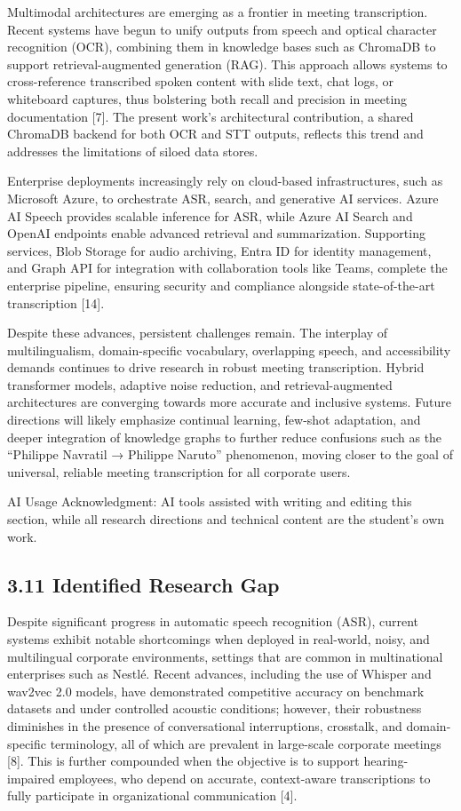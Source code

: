 \documentclass[12pt,a4paper]{article}
\begin{document}
Multimodal architectures are emerging as a frontier in meeting transcription. Recent systems have begun to unify outputs from speech and optical character recognition (OCR), combining them in knowledge bases such as ChromaDB to support retrieval-augmented generation (RAG). This approach allows systems to cross-reference transcribed spoken content with slide text, chat logs, or whiteboard captures, thus bolstering both recall and precision in meeting documentation [7]. The present work’s architectural contribution, a shared ChromaDB backend for both OCR and STT outputs, reflects this trend and addresses the limitations of siloed data stores.


Enterprise deployments increasingly rely on cloud-based infrastructures, such as Microsoft Azure, to orchestrate ASR, search, and generative AI services. Azure AI Speech provides scalable inference for ASR, while Azure AI Search and OpenAI endpoints enable advanced retrieval and summarization. Supporting services, Blob Storage for audio archiving, Entra ID for identity management, and Graph API for integration with collaboration tools like Teams, complete the enterprise pipeline, ensuring security and compliance alongside state-of-the-art transcription [14].


Despite these advances, persistent challenges remain. The interplay of multilingualism, domain-specific vocabulary, overlapping speech, and accessibility demands continues to drive research in robust meeting transcription. Hybrid transformer models, adaptive noise reduction, and retrieval-augmented architectures are converging towards more accurate and inclusive systems. Future directions will likely emphasize continual learning, few-shot adaptation, and deeper integration of knowledge graphs to further reduce confusions such as the “Philippe Navratil → Philippe Naruto” phenomenon, moving closer to the goal of universal, reliable meeting transcription for all corporate users.


AI Usage Acknowledgment: AI tools assisted with writing and editing this section, while all research directions and technical content are the student’s own work.


\subsection{3.11 Identified Research Gap}


Despite significant progress in automatic speech recognition (ASR), current systems exhibit notable shortcomings when deployed in real-world, noisy, and multilingual corporate environments, settings that are common in multinational enterprises such as Nestlé. Recent advances, including the use of Whisper and wav2vec 2.0 models, have demonstrated competitive accuracy on benchmark datasets and under controlled acoustic conditions; however, their robustness diminishes in the presence of conversational interruptions, crosstalk, and domain-specific terminology, all of which are prevalent in large-scale corporate meetings [8]. This is further compounded when the objective is to support hearing-impaired employees, who depend on accurate, context-aware transcriptions to fully participate in organizational communication [4].
\end{document}
